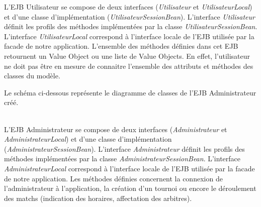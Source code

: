 \documentclass[10pt]{report}
\begin{document}
L'EJB Utilisateur se compose de deux interfaces (\textit{Utilisateur} et \textit{UtilisateurLocal}) et d'une classe d'implémentation (\textit{UtilisateurSessionBean}). L'interface \textit{Utilisateur} définit les profils des méthodes implémentées par la classe \textit{UtilisateurSessionBean}. L'interface \textit{UtilisateurLocal} correspond à l'interface locale de l'EJB utilisée par la facade de notre application. L'ensemble des méthodes définies dans cet EJB retournent un Value Object ou une liste de Value Objects. En effet, l'utilisateur ne doit pas être en mesure de connaitre l'ensemble des attributs et méthodes des classes du modèle.

\newpage
Le schéma ci-dessous représente le diagramme de classes de l'EJB Administrateur créé.
\\
	\begin{figure}[hp]
	      \begin{center}
	      \end{center}
	\end{figure}
\\

L'EJB Administrateur se compose de deux interfaces (\textit{Administrateur} et \textit{AdministrateurLocal}) et d'une classe d'implémentation (\textit{AdministrateurSessionBean}). L'interface \textit{Administrateur} définit les profils des méthodes implémentées par la classe \textit{AdministrateurSessionBean}. L'interface \textit{AdministrateurLocal} correspond à l'interface locale de l'EJB utilisée par la facade de notre application. Les méthodes définies concernent la connexion de l'administrateur à l'application, la création d'un tournoi ou encore le déroulement des matchs (indication des horaires, affectation des arbitres).
\end{document}

